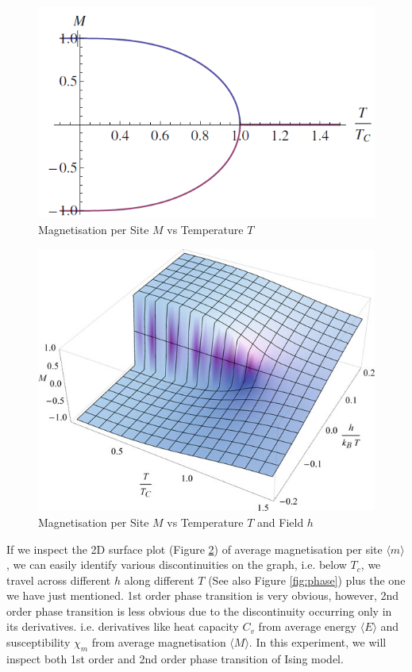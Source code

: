 \documentclass[a4paper]{article}
\numberwithin{equation}{section}
\begin{document}
\begin{figure}
	\centering
	\includegraphics[scale=0.5]{idealmvst.png}
	\caption{Magnetisation per Site $M$ vs Temperature $T$ \cite{softmatter}}
	\label{fig:idealmvst}
\end{figure}
\begin{figure}
	\centering
	\includegraphics[scale=0.7]{mvsth.png}
	\caption{Magnetisation per Site $M$ vs Temperature $T$ and Field $h$ \cite{softmatter}}
	\label{fig:mvsth}
\end{figure}
If we inspect the 2D surface plot (Figure \ref{fig:mvsth}) of average magnetisation per site $\langle m \rangle$, we can easily identify various discontinuities on the graph, i.e. below $T_c$, we travel across different $h$ along different $T$ (See also Figure \ref{fig:phase}) plus the one we have just mentioned. 1st order phase transition is very obvious, however, 2nd order phase transition is less obvious due to the discontinuity occurring only in its derivatives. i.e. derivatives like heat capacity $C_v$ from average energy $\langle E \rangle$ and susceptibility $\chi_m$ from average magnetisation $\langle M \rangle$. In this experiment, we will inspect both 1st order and 2nd order phase transition of Ising model.
\end{document}
